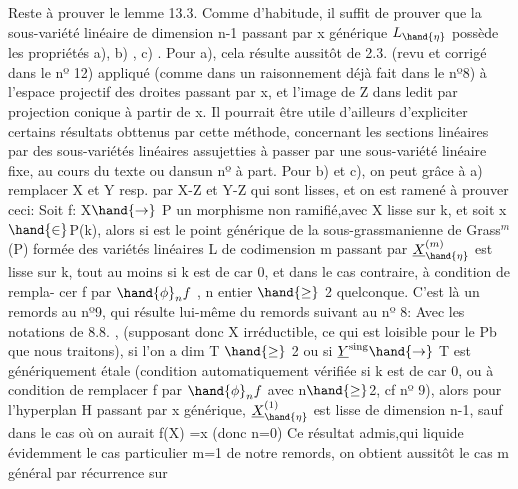 
Reste à prouver le lemme 13.3.  Comme d'habitude, il suffit de prouver
que  la sous-variété linéaire de dimension n-1  passant par x générique
$L_{\hand{\eta}}$  possède les propriétés  a), b) , c) .  Pour  a),  cela résulte 
aussitôt de 2.3. (revu et corrigé dans le nº 12)  appliqué (comme dans un
raisonnement déjà fait dans le nº8) à l'espace projectif  des droites
passant par x, et l'image de Z dans ledit par projection conique à
partir de x. \hand{[}Il pourrait être utile d'ailleurs d'expliciter certains
\margin{|} résultats obttenus par cette méthode, concernant les sections linéaires
par des sous-variétés linéaires assujetties à passer par une sous-variété
linéaire fixe,  au cours du texte ou dans\hand{/}un nº à part\hand{]}.  Pour  b) et c),
 on peut grâce à a)  remplacer X et Y  resp. par X-Z et Y-Z
qui sont lisses, et on est  ramené à prouver ceci:  Soit f: X$\hand{\rightarrow}$ P un
morphisme non ramifié,\hand{(}avec X lisse sur k, et soit  x $\hand{\in}$P(k), alors si
\hand{$\eta$} est le point générique  de  la sous-grassmanienne  de Grass$^{m}$(P)
formée des variétés linéaires L de codimension m passant par  
 \inserted[typed]{\&} $\underline{X}^{(m)}_{\hand{\eta}}$ est  lisse sur k, tout au
\margin{(} moins si k est de car 0, et dans le cas contraire, à condition de rempla-%
cer f par $\hand{\phi}_{n}f$ , n entier $\hand{\geq}$ 2 quelconque.  C'est là  un remords au nº9,
qui résulte lui-même du remords suivant au nº 8:  Avec les notations de
8.8. , (supposant donc X irréductible, ce qui est loisible pour le Pb
que nous traitons), si  l'on a dim T $\hand{\geq}$ 2  ou si  $\underline{Y}^{\text{sing}}\hand{\rightarrow}$ T  est
génériquement étale (condition automatiquement vérifiée si k est de car 0,
ou à condition de remplacer f par $\hand{\phi}_{n}f$ avec n$\hand{\geq}$2, cf nº 9), alors pour
l'hyperplan  H\hand{$_{\eta}$} passant par x  générique,  $\underline{X}^{(1)}_{\hand{\eta}}$ est lisse
de dimension n-1,  sauf dans le cas  où  on aurait  f(X) =\hand{$\{$}x\hand{$\}$}  (donc n=0)
Ce résultat admis,\hand{(}qui liquide évidemment le cas particulier m=1 de
notre remords, on obtient aussitôt le cas  m général  par récurrence sur

